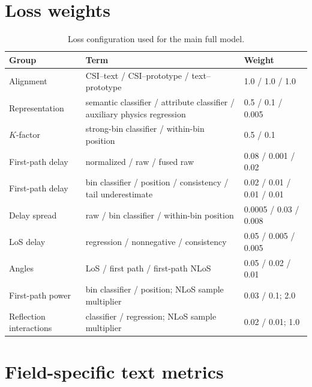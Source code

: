 \documentclass{article}
\begin{document}
\section{Loss weights}
\label{app:weights}

\begin{table}[h]
\centering
\caption{Loss configuration used for the main full model.}
\label{tab:weights}
\begin{tabular}{lll}
\toprule
Group & Term & Weight\\
\midrule
Alignment & CSI--text / CSI--prototype / text--prototype & 1.0 / 1.0 / 1.0\\
Representation & semantic classifier / attribute classifier / auxiliary physics regression & 0.5 / 0.1 / 0.005\\
$K$-factor & strong-bin classifier / within-bin position & 0.5 / 0.1\\
First-path delay & normalized / raw / fused raw & 0.08 / 0.001 / 0.02\\
First-path delay & bin classifier / position / consistency / tail underestimate & 0.02 / 0.01 / 0.01 / 0.01\\
Delay spread & raw / bin classifier / within-bin position & 0.0005 / 0.03 / 0.008\\
LoS delay & regression / nonnegative / consistency & 0.05 / 0.005 / 0.005\\
Angles & LoS / first path / first-path NLoS & 0.05 / 0.02 / 0.01\\
First-path power & bin classifier / position; NLoS sample multiplier & 0.03 / 0.1; 2.0\\
Reflection interactions & classifier / regression; NLoS sample multiplier & 0.02 / 0.01; 1.0\\
\bottomrule
\end{tabular}
\end{table}

\section{Field-specific text metrics}
\label{app:textmetrics}
\end{document}
